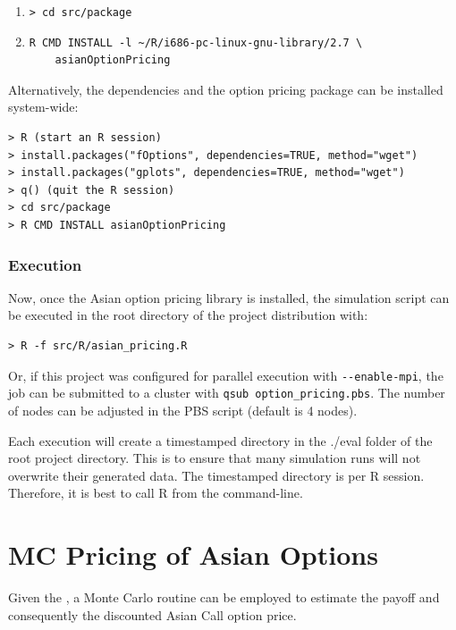 \documentclass[12pt,a4paper]{article}
\begin{document}
\begin{enumerate}
\item \verb=> cd src/package=
\item
\begin{verbatim}
R CMD INSTALL -l ~/R/i686-pc-linux-gnu-library/2.7 \
    asianOptionPricing
\end{verbatim}
\end{enumerate}

Alternatively, the dependencies and the option pricing package can be
installed system-wide:

\begin{verbatim}
> R (start an R session)
> install.packages("fOptions", dependencies=TRUE, method="wget")
> install.packages("gplots", dependencies=TRUE, method="wget")
> q() (quit the R session)
> cd src/package
> R CMD INSTALL asianOptionPricing
\end{verbatim}

\subsubsection{Execution}
\label{sec:execution}

Now, once the Asian option pricing library is installed, the
simulation script can be executed in the root directory of the project
distribution with:

\begin{verbatim}
> R -f src/R/asian_pricing.R
\end{verbatim}

Or, if this project was configured for parallel execution with
\verb=--enable-mpi=, the job can be submitted to a cluster with
\verb=qsub option_pricing.pbs=. The number of nodes can be adjusted in
the PBS script (default is 4 nodes).

Each execution will create a timestamped directory in the ./eval
folder of the root project directory. This is to ensure that many
simulation runs will not overwrite their generated data. The
timestamped directory is per R session. Therefore, it is best to call
R from the command-line.


\section{MC Pricing of Asian Options}
\label{sec:mc-pricing-Asian}

Given the , a Monte Carlo routine can
be employed to estimate the payoff and consequently the discounted
Asian Call option price.
\end{document}

